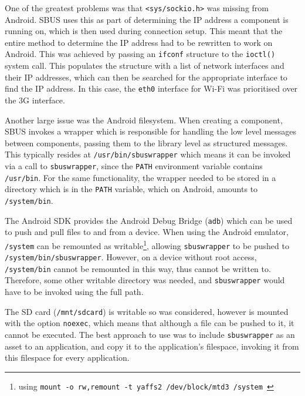 \documentclass[12pt,twoside,notitlepage]{report}
\begin{document}
One of the greatest problems was that {\tt <sys/sockio.h>} was missing from Android.
SBUS uses this as part of determining the IP address a component is running on, which is then used during connection setup. 
This meant that the entire method to determine the IP address had to be rewritten to work on Android. 
This was achieved by passing an {\tt ifconf} structure to the {\tt ioctl()} system call.
This populates the structure with a list of network interfaces and their IP addresses, which can then be searched for the appropriate interface to find the IP address. 
In this case, the {\tt eth0} interface for Wi-Fi was prioritised over the 3G interface.

Another large issue was the Android filesystem. 
When creating a component, SBUS invokes a wrapper which is responsible for handling the low level messages between components, passing them to the library level as structured messages.
This typically resides at {\tt /usr/bin/sbuswrapper} which means it can be invoked via a call to {\tt sbuswrapper}, since the {\tt PATH} environment variable contains {\tt /usr/bin}. 
For the same functionality, the wrapper needed to be stored in a directory which is in the {\tt PATH} variable, which on Android, amounts to {\tt /system/bin}. 

The Android SDK provides the Android Debug Bridge ({\tt adb}) which can be used to push and pull files to and from a device. 
When using the Android emulator, {\tt /system} can be remounted as writable\footnote{using {\tt mount -o rw,remount -t yaffs2 /dev/block/mtd3 /system }}, allowing {\tt sbuswrapper} to be pushed to {\tt /system/bin/sbuswrapper}. 
However, on a device without root access, {\tt /system/bin} cannot be remounted in this way, thus cannot be written to. 
Therefore, some other writable directory was needed, and {\tt sbuswrapper} would have to be invoked using the full path. 

The SD card ({\tt /mnt/sdcard}) is writable so was considered, however is mounted with the option {\tt noexec}, which means that although a file can be pushed to it, it cannot be executed. 
The best approach to use was to include {\tt sbuswrapper} as an asset to an application, and copy it to the application's filespace, invoking it from this filespace for every application. 
\end{document}
